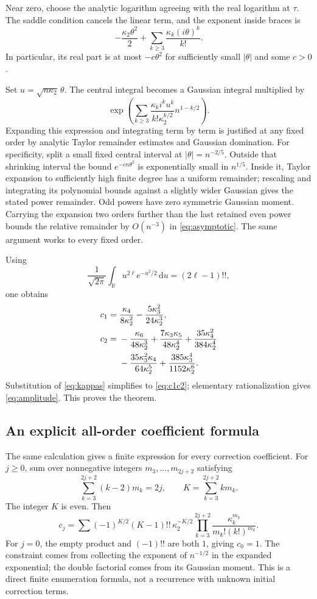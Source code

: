 \documentclass[11pt,a4paper]{article}
\numberwithin{equation}{section}
\theoremstyle{definition}
\theoremstyle{remark}
\newcommand{\R}{\mathbb R}
\newcommand{\dd}{\,\mathrm d}
\begin{document}
Near zero, choose the analytic logarithm agreeing with the real logarithm
at $\tau$. The saddle condition cancels the linear term, and the exponent
inside braces is
\begin{equation}\label{eq:local-exponent}
 -\frac{\kappa_2\theta^2}{2}
 +\sum_{k\ge3}\frac{\kappa_k(i\theta)^k}{k!}.
\end{equation}
In particular, its real part is at most $-c\theta^2$ for sufficiently small
$|\theta|$ and some $c>0$.

Set $u=\sqrt{n\kappa_2}\,\theta$. The central integral becomes a Gaussian
integral multiplied by
\[
 \exp\left(\sum_{k\ge3}
 \frac{\kappa_k i^k u^k}
 {k!\kappa_2^{k/2}}n^{1-k/2}\right).
\]
Expanding this expression and integrating term by term is justified at any
fixed order by analytic Taylor remainder estimates and Gaussian domination.
For specificity, split a small fixed central interval at
$|\theta|=n^{-2/5}$. Outside that shrinking interval the bound
$e^{-cn\theta^2}$ is exponentially small in $n^{1/5}$. Inside it, Taylor
expansion to sufficiently high finite degree has a uniform remainder;
rescaling and integrating its polynomial bounds against a slightly wider
Gaussian gives the stated power remainder. Odd powers have zero symmetric
Gaussian moment. Carrying the expansion two orders further than the last
retained even power bounds the relative remainder by $O(n^{-3})$ in
\eqref{eq:asymptotic}. The same argument works to every fixed order.

Using
\[
 \frac1{\sqrt{2\pi}}\int_{\R}u^{2\ell}e^{-u^2/2}\dd u=(2\ell-1)!!,
\]
one obtains
\begin{align}\label{eq:cumulant-corrections}
 c_1={}&\frac{\kappa_4}{8\kappa_2^2}
       -\frac{5\kappa_3^2}{24\kappa_2^3},\notag\\
 c_2={}&-\frac{\kappa_6}{48\kappa_2^3}
 +\frac{7\kappa_3\kappa_5}{48\kappa_2^4}
 +\frac{35\kappa_4^2}{384\kappa_2^4}\notag\\
 &-\frac{35\kappa_3^2\kappa_4}{64\kappa_2^5}
 +\frac{385\kappa_3^4}{1152\kappa_2^6}.
\end{align}
Substitution of \eqref{eq:kappas} simplifies to \eqref{eq:c1c2}; elementary
rationalization gives \eqref{eq:amplitude}. This proves the theorem.

\subsection{An explicit all-order coefficient formula}
The same calculation gives a finite expression for every correction
coefficient. For $j\ge0$, sum over nonnegative integers
$m_3,\ldots,m_{2j+2}$ satisfying
\[
 \sum_{k=3}^{2j+2}(k-2)m_k=2j,
 \qquad K=\sum_{k=3}^{2j+2}km_k.
\]
The integer $K$ is even. Then
\begin{equation}\label{eq:allorder}
 c_j=\sum
 (-1)^{K/2}(K-1)!!\,\kappa_2^{-K/2}
 \prod_{k=3}^{2j+2}\frac{\kappa_k^{m_k}}{m_k!(k!)^{m_k}}.
\end{equation}
For $j=0$, the empty product and $(-1)!!$ are both $1$, giving $c_0=1$.
The constraint comes from collecting the exponent of $n^{-1/2}$ in the
expanded exponential; the double factorial comes from its Gaussian moment.
This is a direct finite enumeration formula, not a recurrence with unknown
initial correction terms.
\end{document}
